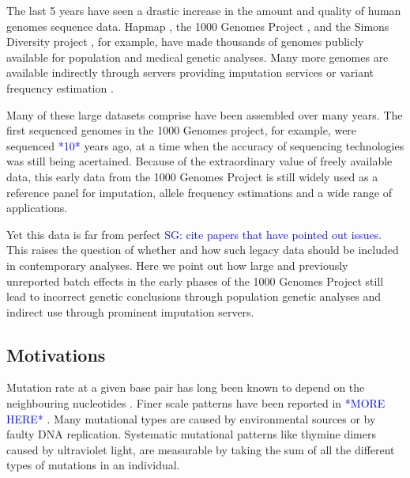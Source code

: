 \documentclass[9pt,lineno]{elife}
\newcommand{\sgcomment}[1]{\textcolor{blue}{SG: #1}}
\newcommand{\todo}[1]{\textcolor{blue}{*#1*}}
\begin{document}

The last 5 years have seen a drastic increase in the amount and quality of human genomes sequence data. 
Hapmap \cite{}, the 1000 Genomes Project \cite{}, and the Simons Diversity project \cite{}, for example, have made thousands of genomes publicly available for population and medical genetic analyses. 
Many more genomes are available indirectly through servers providing imputation services \cite{haplotype reference consortium} or variant frequency estimation \cite{GnomAD}. 

Many of these large datasets comprise have been assembled over many years. 
The first sequenced genomes in the 1000 Genomes project, for example, were sequenced \todo{10} years ago, at a time when the accuracy of sequencing technologies was still being acertained. %
Because of the extraordinary value of freely available data, this early data from the 1000 Genomes Project is still widely used as a reference panel for imputation, allele frequency estimations and a wide range of applications. 

Yet this data is far from perfect \sgcomment{cite papers that have pointed out issues}. This raises the question of whether and how such legacy data should be included in contemporary analyses. Here we point out how large and previously unreported batch effects in the early phases of the 1000 Genomes Project still lead to incorrect genetic conclusions through population genetic analyses and indirect use through prominent imputation servers.  

\subsection{Motivations}

Mutation rate at a given base pair has long been known to depend on the neighbouring nucleotides \cite{}. 
Finer scale patterns have been reported in \todo{MORE HERE} \cite{}. 
Many mutational types are caused by environmental sources or by faulty DNA replication.
Systematic mutational patterns like thymine dimers caused by ultraviolet light, are measurable by taking the sum of all the different types of mutations in an individual.
\end{document}
